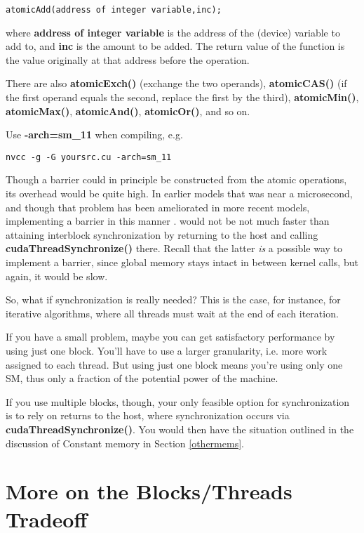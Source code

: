 \begin{Verbatim}[fontsize=\relsize{-2}]
atomicAdd(address of integer variable,inc);
\end{Verbatim}

where {\bf address of integer variable} is the address of the (device)
variable to add to, and {\bf inc} is the amount to be added.  The return
value of the function is the value originally at that address before the
operation.

There are also {\bf atomicExch()} (exchange the two operands), {\bf
atomicCAS()} (if the first operand equals the second, replace the first
by the third), {\bf atomicMin()}, {\bf atomicMax()}, {\bf atomicAnd()},
{\bf atomicOr()}, and so on.

Use {\bf -arch=sm\_11} when compiling, e.g.

\begin{Verbatim}[fontsize=\relsize{-2}]
nvcc -g -G yoursrc.cu -arch=sm_11
\end{Verbatim}

Though a barrier could in principle be constructed from the atomic
operations, its overhead would be quite high.  In earlier models that
was near a microsecond, and though that problem has been ameliorated in
more recent models, implementing a barrier in this manner .  would not
be not much faster than attaining interblock synchronization by
returning to the host and calling {\bf cudaThreadSynchronize()} there.
Recall that the latter {\it is} a possible way to implement a barrier,
since global memory stays intact in between kernel calls, but again, it
would be slow.

So, what if synchronization is really needed?  This is the case, for
instance, for iterative algorithms, where all threads must wait at the
end of each iteration.

If you have a small problem, maybe you can get satisfactory performance
by using just one block.  You'll have to use a larger granularity, i.e.
more work assigned to each thread.  But using just one block means
you're using only one SM, thus only a fraction of the potential power of
the machine.  

If you use multiple blocks, though, your only feasible option for
synchronization is to rely on returns to the host, where synchronization
occurs via {\bf cudaThreadSynchronize()}.  You would then have the
situation outlined in the discussion of Constant memory in Section
\ref{othermems}.

\section{More on the Blocks/Threads Tradeoff}

